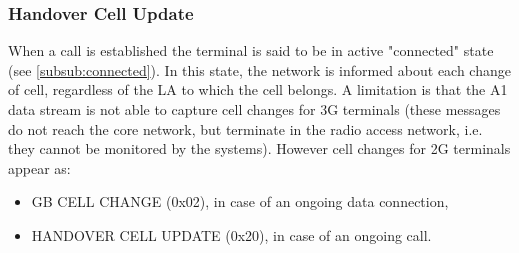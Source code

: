 \documentclass[master,english]{hgbthesis}
\begin{document}
\subsubsection{Handover Cell Update}
When a call is established the terminal is said to be in active "connected" state (see \ref{subsub:connected}).  In this state, the network is informed about each change of cell, regardless of the LA to which the cell belongs. A limitation is that the A1 data stream is not able to capture cell changes for 3G terminals (these messages do not reach the core network, but terminate in the radio access network, i.e. they cannot be monitored by the systems).
However cell changes for 2G terminals appear as:
\begin{itemize}
	\item GB CELL CHANGE (0x02), in case of an ongoing data connection,
	\item HANDOVER CELL UPDATE (0x20), in case of an ongoing call.
\end{itemize}
\end{document}
